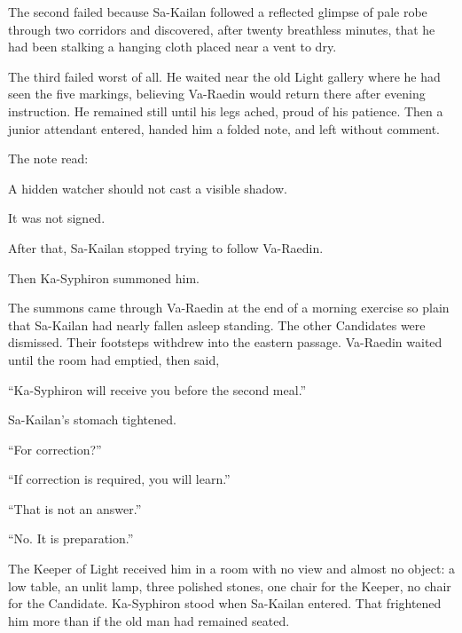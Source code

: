 The second failed because Sa-Kailan followed a reflected glimpse of pale robe through two corridors and discovered, after twenty breathless minutes, that he had been stalking a hanging cloth placed near a vent to dry.\par

The third failed worst of all. He waited near the old Light gallery where he had seen the five markings, believing Va-Raedin would return there after evening instruction. He remained still until his legs ached, proud of his patience. Then a junior attendant entered, handed him a folded note, and left without comment.\par

The note read:\par

A hidden watcher should not cast a visible shadow.\par

It was not signed.\par

After that, Sa-Kailan stopped trying to follow Va-Raedin.\par

Then Ka-Syphiron summoned him.\par

The summons came through Va-Raedin at the end of a morning exercise so plain that Sa-Kailan had nearly fallen asleep standing. The other Candidates were dismissed. Their footsteps withdrew into the eastern passage. Va-Raedin waited until the room had emptied, then said,\par

“Ka-Syphiron will receive you before the second meal.”\par

Sa-Kailan’s stomach tightened.\par

“For correction?”\par

“If correction is required, you will learn.”\par

“That is not an answer.”\par

“No. It is preparation.”\par

The Keeper of Light received him in a room with no view and almost no object: a low table, an unlit lamp, three polished stones, one chair for the Keeper, no chair for the Candidate. Ka-Syphiron stood when Sa-Kailan entered. That frightened him more than if the old man had remained seated.\par

